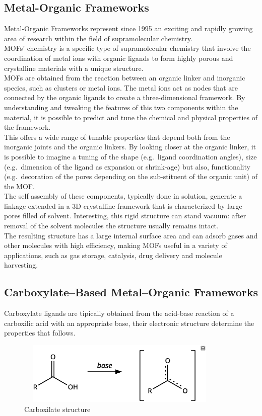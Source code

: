 \documentclass[../Master.tex]{subfiles}
\begin{document}
\subsection{Metal-Organic Frameworks}\label{subsec:mof}
Metal-Organic Frameworks represent since 1995 \cite{yaghi_hydrothermal_1995} an exciting and rapidly growing area of research within the field of supramolecular chemistry.\\
MOFs' chemistry is a specific type of supramolecular chemistry that involve the coordination of metal ions with organic ligands to form highly porous and crystalline materials with a unique structure. \\
MOFs are obtained from the reaction between an organic linker and inorganic species, such as clusters or metal ions. The metal ions act as nodes that are connected by the organic ligands to create a three-dimensional framework. By understanding and tweaking the features of this two components within the material, it is possible to predict and tune the chemical and physical properties of the framework.\\
This offers a wide range of tunable properties that depend both from the inorganic joints and the organic linkers. By looking closer at the organic linker, it is possible to imagine a tuning of the shape (e.g.\ ligand coordination angles), size (e.g.\ dimension of the ligand as expansion or shrink-age) but also, functionality (e.g.\ decoration of the pores depending on the sub-stituent of the organic unit) of the MOF.\\
The self assembly of these components, typically done in solution, generate a linkage extended in a 3D crystalline framework that is characterized by large pores filled of solvent. Interesting, this rigid structure can stand vacuum: after removal of the solvent molecules the structure usually remains intact. \\
The resulting structure has a large internal surface area and can adsorb gases and other molecules with high efficiency, making MOFs useful in a variety of applications, such as gas storage, catalysis, drug delivery and molecule harvesting.

\subsection{Carboxylate–Based Metal–Organic Frameworks}\label{cb-mof}

Carboxylate ligands are tipically obtained from the acid-base reaction of a carboxilic acid with an appropriate base, their electronic structure determine the properties that follows. \\
\begin{figure}[h!]
	\centering
	\includegraphics[width=10cm,height=3cm,keepaspectratio]{Structures/carboxstructure.eps}
	\caption{Carboxilate structure}\label{fig:carboxstructure}
\end{figure}
\end{document}
